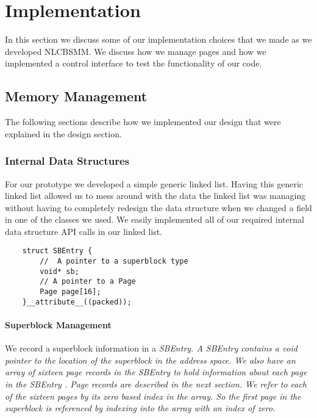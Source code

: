 \documentclass[9pt]{sig-alternate-10pt}
\begin{document}
%
%
\section{Implementation}
\label{implementation}
In this section we discuss some of our implementation choices that we made as we developed NLCBSMM. We discuss how we manage pages and how we implemented a control interface to test the functionality of our code.


\subsection{Memory Management}
The following sections describe how we implemented our design that were explained in the design section.

\subsubsection{Internal Data Structures}
For our prototype we developed a simple generic linked list. Having this generic linked list allowed us to mess around with the data the linked list was managing without having to completely redesign the data structure when we changed a field in one of the classes we used. We easily implemented all of our required internal data structure API calls in our linked list.

\begin{verbatim}
    struct SBEntry {
        //  A pointer to a superblock type
        void* sb;
        // A pointer to a Page  
        Page page[16];
    }__attribute__((packed));
\end{verbatim}

\paragraph{Superblock Management}
We record a superblock information in a \em SBEntry\em. A \em SBEntry \em contains a  void pointer to the location of the superblock in the address space. We also have an array of sixteen page records in the \em SBEntry \em to hold information about each page in the \em SBEntry \em. Page records are described in the next section. We refer to each of the sixteen pages by its zero based index in the array. So the first page in the superblock is referenced by indexing into the array with an index of zero.
\end{document}
